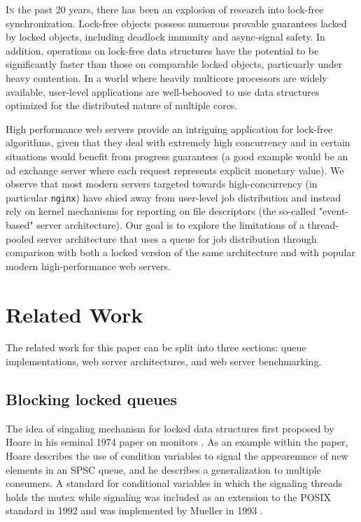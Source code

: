 \documentclass[twoside,10pt]{article}
\begin{document}
\begin{multicols}{2}
  \lettrine[nindent=0em,lines=3]{I}n the past 20 years, there has been
  an explosion of research into lock-free synchronization. Lock-free
  objects possess numerous provable guarantees lacked by locked
  objects, including deadlock immunity and async-signal safety. In
  addition, operations on lock-free data structures have the potential
  to be significantly faster than those on comparable locked objects,
  particuarly under heavy contention. In a world where heavily
  multicore processors are widely available, user-level applications
  are well-behooved to use data structures optimized for the
  distributed nature of multiple cores.
  
High performance web servers provide an intriguing application for
lock-free algorithms, given that they deal with extremely high
concurrency and in certain situations would benefit from progress
guarantees (a good example would be an ad exchange server where each
request represents explicit monetary value). We observe that most
modern servers targeted towards high-concurrency (in particular
\verb+nginx+) have shied away from user-level job distribution and
instead rely on kernel mechanisms for reporting on file descriptors
(the so-called "event-based" server architecture). Our goal is to
explore the limitations of a thread-pooled server architecture that
uses a queue for job distribution through comparison with both a
locked version of the same architecture and with popular modern
high-performance web servers.

\section{Related Work}

The related work for this paper can be split into three sections:
queue implementations, web server architectures, and web
server benchmarking.

\subsection{Blocking locked queues}

The idea of singaling mechanism for locked data structures first
proposed by Hoare in his seminal 1974 paper on monitors
\cite{hoare1974monitors}. As an example within the paper, Hoare
describes the use of condition variables to signal the appearemnce of
new elements in an SPSC queue, and he describes a generalization to
multiple consumers. A standard for conditional variables in which the
signaling threads holds the mutex while signaling was included as an
extension to the POSIX standard in 1992 and was implemented by Mueller
in 1993 \cite{ieee1992pthreads,mueller1993library}.


\end{multicols}
\end{document}
